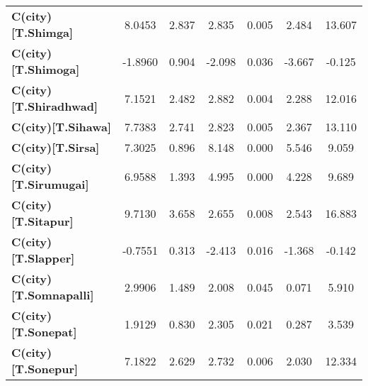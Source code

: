 \begin{center}
\begin{tabular}{lcccccc}
\textbf{C(city)[T.Shimga]}                                                                          &       8.0453  &        2.837     &     2.835  &         0.005        &        2.484    &       13.607     \\
\textbf{C(city)[T.Shimoga]}                                                                         &      -1.8960  &        0.904     &    -2.098  &         0.036        &       -3.667    &       -0.125     \\
\textbf{C(city)[T.Shiradhwad]}                                                                      &       7.1521  &        2.482     &     2.882  &         0.004        &        2.288    &       12.016     \\
\textbf{C(city)[T.Sihawa]}                                                                          &       7.7383  &        2.741     &     2.823  &         0.005        &        2.367    &       13.110     \\
\textbf{C(city)[T.Sirsa]}                                                                           &       7.3025  &        0.896     &     8.148  &         0.000        &        5.546    &        9.059     \\
\textbf{C(city)[T.Sirumugai]}                                                                       &       6.9588  &        1.393     &     4.995  &         0.000        &        4.228    &        9.689     \\
\textbf{C(city)[T.Sitapur]}                                                                         &       9.7130  &        3.658     &     2.655  &         0.008        &        2.543    &       16.883     \\
\textbf{C(city)[T.Slapper]}                                                                         &      -0.7551  &        0.313     &    -2.413  &         0.016        &       -1.368    &       -0.142     \\
\textbf{C(city)[T.Somnapalli]}                                                                      &       2.9906  &        1.489     &     2.008  &         0.045        &        0.071    &        5.910     \\
\textbf{C(city)[T.Sonepat]}                                                                         &       1.9129  &        0.830     &     2.305  &         0.021        &        0.287    &        3.539     \\
\textbf{C(city)[T.Sonepur]}                                                                         &       7.1822  &        2.629     &     2.732  &         0.006        &        2.030    &       12.334     \\

\end{tabular}
\end{center}
